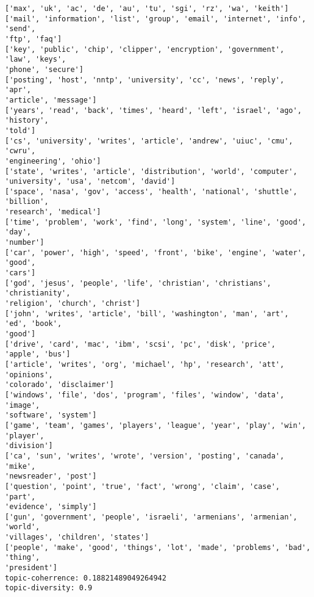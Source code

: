 \documentclass[11pt]{article}
\begin{document}
    \begin{Verbatim}[commandchars=\\\{\}]
['max', 'uk', 'ac', 'de', 'au', 'tu', 'sgi', 'rz', 'wa', 'keith']
['mail', 'information', 'list', 'group', 'email', 'internet', 'info', 'send',
'ftp', 'faq']
['key', 'public', 'chip', 'clipper', 'encryption', 'government', 'law', 'keys',
'phone', 'secure']
['posting', 'host', 'nntp', 'university', 'cc', 'news', 'reply', 'apr',
'article', 'message']
['years', 'read', 'back', 'times', 'heard', 'left', 'israel', 'ago', 'history',
'told']
['cs', 'university', 'writes', 'article', 'andrew', 'uiuc', 'cmu', 'cwru',
'engineering', 'ohio']
['state', 'writes', 'article', 'distribution', 'world', 'computer',
'university', 'usa', 'netcom', 'david']
['space', 'nasa', 'gov', 'access', 'health', 'national', 'shuttle', 'billion',
'research', 'medical']
['time', 'problem', 'work', 'find', 'long', 'system', 'line', 'good', 'day',
'number']
['car', 'power', 'high', 'speed', 'front', 'bike', 'engine', 'water', 'good',
'cars']
['god', 'jesus', 'people', 'life', 'christian', 'christians', 'christianity',
'religion', 'church', 'christ']
['john', 'writes', 'article', 'bill', 'washington', 'man', 'art', 'ed', 'book',
'good']
['drive', 'card', 'mac', 'ibm', 'scsi', 'pc', 'disk', 'price', 'apple', 'bus']
['article', 'writes', 'org', 'michael', 'hp', 'research', 'att', 'opinions',
'colorado', 'disclaimer']
['windows', 'file', 'dos', 'program', 'files', 'window', 'data', 'image',
'software', 'system']
['game', 'team', 'games', 'players', 'league', 'year', 'play', 'win', 'player',
'division']
['ca', 'sun', 'writes', 'wrote', 'version', 'posting', 'canada', 'mike',
'newsreader', 'post']
['question', 'point', 'true', 'fact', 'wrong', 'claim', 'case', 'part',
'evidence', 'simply']
['gun', 'government', 'people', 'israeli', 'armenians', 'armenian', 'world',
'villages', 'children', 'states']
['people', 'make', 'good', 'things', 'lot', 'made', 'problems', 'bad', 'thing',
'president']
topic-coherrence: 0.18821489049264942
topic-diversity: 0.9
\end{Verbatim}


    
    
    
    
\end{document}
